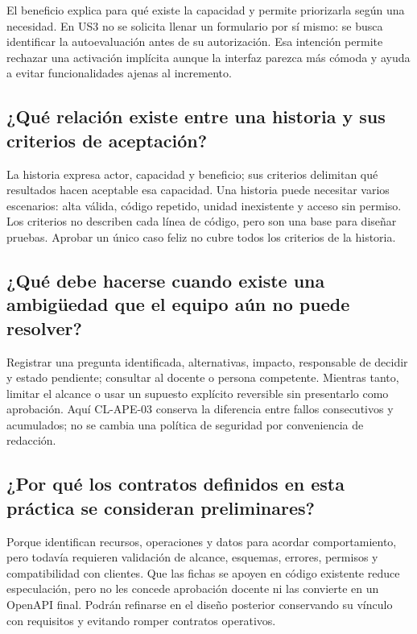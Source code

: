 \documentclass[11pt,a4paper]{article}
\begin{document}
El beneficio explica para qué existe la capacidad y permite priorizarla
según una necesidad. En US3 no se solicita llenar un formulario por sí
mismo: se busca identificar la autoevaluación antes de su autorización.
Esa intención permite rechazar una activación implícita aunque la
interfaz parezca más cómoda y ayuda a evitar funcionalidades ajenas al
incremento.

\subsection{¿Qué relación existe entre una historia y sus criterios de
aceptación?}\label{quuxe9-relaciuxf3n-existe-entre-una-historia-y-sus-criterios-de-aceptaciuxf3n}

La historia expresa actor, capacidad y beneficio; sus criterios
delimitan qué resultados hacen aceptable esa capacidad. Una historia
puede necesitar varios escenarios: alta válida, código repetido, unidad
inexistente y acceso sin permiso. Los criterios no describen cada línea
de código, pero son una base para diseñar pruebas. Aprobar un único caso
feliz no cubre todos los criterios de la historia.

\subsection{¿Qué debe hacerse cuando existe una ambigüedad que el equipo
aún no puede
resolver?}\label{quuxe9-debe-hacerse-cuando-existe-una-ambiguxfcedad-que-el-equipo-auxfan-no-puede-resolver}

Registrar una pregunta identificada, alternativas, impacto, responsable
de decidir y estado pendiente; consultar al docente o persona
competente. Mientras tanto, limitar el alcance o usar un supuesto
explícito reversible sin presentarlo como aprobación. Aquí CL-APE-03
conserva la diferencia entre fallos consecutivos y acumulados; no se
cambia una política de seguridad por conveniencia de redacción.

\subsection{¿Por qué los contratos definidos en esta práctica se
consideran
preliminares?}\label{por-quuxe9-los-contratos-definidos-en-esta-pruxe1ctica-se-consideran-preliminares}

Porque identifican recursos, operaciones y datos para acordar
comportamiento, pero todavía requieren validación de alcance, esquemas,
errores, permisos y compatibilidad con clientes. Que las fichas se
apoyen en código existente reduce especulación, pero no les concede
aprobación docente ni las convierte en un OpenAPI final. Podrán
refinarse en el diseño posterior conservando su vínculo con requisitos y
evitando romper contratos operativos.
\end{document}
